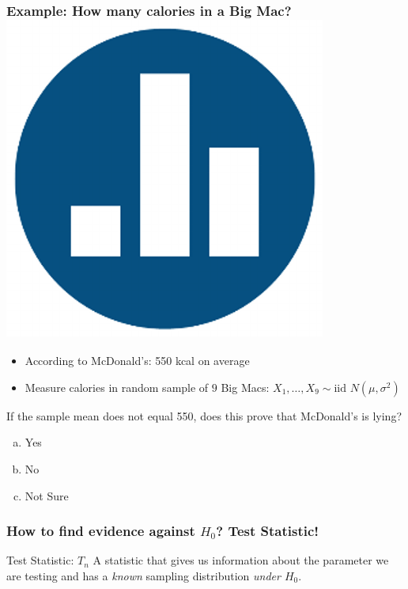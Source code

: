 \documentclass[handout]{beamer}
\begin{document}
\begin{frame}[t]
	\frametitle{Example: How many calories in a Big Mac? \hfill \includegraphics[scale = 0.05]{./images/clicker}}
\begin{itemize}
	\item According to McDonald's: 550 kcal on average
	\item Measure calories in random sample of $9$ Big Macs: $X_1, \hdots, X_{9} \sim \mbox{iid } N(\mu, \sigma^2)$
\end{itemize}

\vspace{1em}

\alert{If the sample mean does not equal 550, does this prove that McDonald's is lying?}
\begin{enumerate}[(a)]
	\item Yes
	\item No
	\item Not Sure
\end{enumerate}
\end{frame}
\begin{frame}
	\frametitle{How to find evidence against $H_0$? Test Statistic!}
	\begin{block}
		{Test Statistic: $T_n$}
		A statistic that gives us information about the parameter we are testing and has a \emph{known} sampling distribution \emph{under $H_0$}.
	\end{block}
\end{frame}
\end{document}
